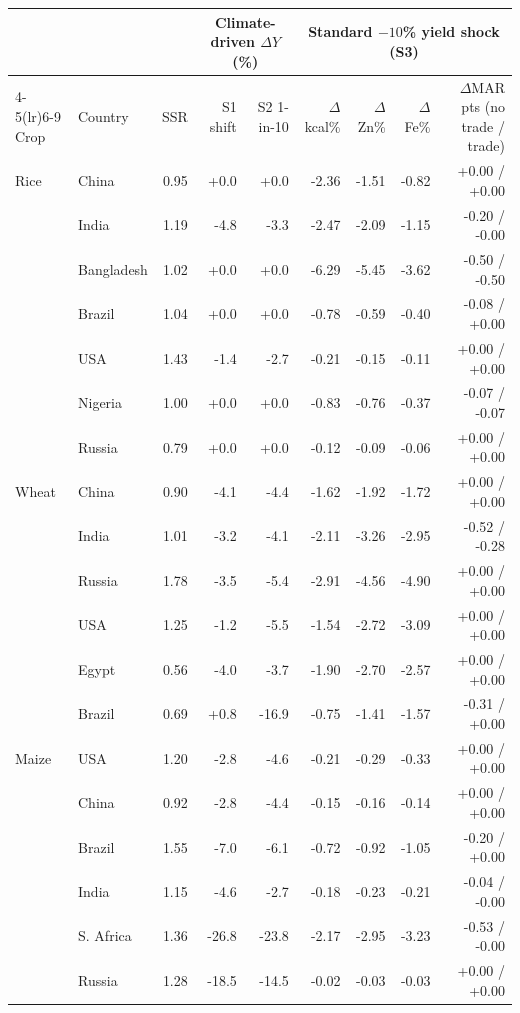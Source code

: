 \begin{tabular}{llrrrrrrr}
\toprule
 & & & \multicolumn{2}{c}{Climate-driven $\Delta Y$ (\%)} & \multicolumn{4}{c}{Standard $-10$\% yield shock (S3)}\\
\cmidrule(lr){4-5}\cmidrule(lr){6-9}
Crop & Country & SSR & S1 shift & S2 1-in-10 & $\Delta$kcal\% & $\Delta$Zn\% & $\Delta$Fe\% & $\Delta$MAR pts (no trade / trade)\\
\midrule
Rice & China & 0.95 & +0.0 & +0.0 & -2.36 & -1.51 & -0.82 & +0.00 / +0.00\\
 & India & 1.19 & -4.8 & -3.3 & -2.47 & -2.09 & -1.15 & -0.20 / -0.00\\
 & Bangladesh & 1.02 & +0.0 & +0.0 & -6.29 & -5.45 & -3.62 & -0.50 / -0.50\\
 & Brazil & 1.04 & +0.0 & +0.0 & -0.78 & -0.59 & -0.40 & -0.08 / +0.00\\
 & USA & 1.43 & -1.4 & -2.7 & -0.21 & -0.15 & -0.11 & +0.00 / +0.00\\
 & Nigeria & 1.00 & +0.0 & +0.0 & -0.83 & -0.76 & -0.37 & -0.07 / -0.07\\
 & Russia & 0.79 & +0.0 & +0.0 & -0.12 & -0.09 & -0.06 & +0.00 / +0.00\\
\midrule
Wheat & China & 0.90 & -4.1 & -4.4 & -1.62 & -1.92 & -1.72 & +0.00 / +0.00\\
 & India & 1.01 & -3.2 & -4.1 & -2.11 & -3.26 & -2.95 & -0.52 / -0.28\\
 & Russia & 1.78 & -3.5 & -5.4 & -2.91 & -4.56 & -4.90 & +0.00 / +0.00\\
 & USA & 1.25 & -1.2 & -5.5 & -1.54 & -2.72 & -3.09 & +0.00 / +0.00\\
 & Egypt & 0.56 & -4.0 & -3.7 & -1.90 & -2.70 & -2.57 & +0.00 / +0.00\\
 & Brazil & 0.69 & +0.8 & -16.9 & -0.75 & -1.41 & -1.57 & -0.31 / +0.00\\
\midrule
Maize & USA & 1.20 & -2.8 & -4.6 & -0.21 & -0.29 & -0.33 & +0.00 / +0.00\\
 & China & 0.92 & -2.8 & -4.4 & -0.15 & -0.16 & -0.14 & +0.00 / +0.00\\
 & Brazil & 1.55 & -7.0 & -6.1 & -0.72 & -0.92 & -1.05 & -0.20 / +0.00\\
 & India & 1.15 & -4.6 & -2.7 & -0.18 & -0.23 & -0.21 & -0.04 / -0.00\\
 & S. Africa & 1.36 & -26.8 & -23.8 & -2.17 & -2.95 & -3.23 & -0.53 / -0.00\\
 & Russia & 1.28 & -18.5 & -14.5 & -0.02 & -0.03 & -0.03 & +0.00 / +0.00\\

\end{tabular}
